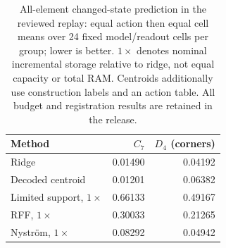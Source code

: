 \begin{table}[htbp]\centering\small
\begin{tabular}{lrr}\toprule
Method & $C_7$ & $D_4$ (corners) \\
\midrule
Ridge & 0.01490 & 0.04192 \\
Decoded centroid & 0.01201 & 0.06382 \\
Limited support, $1\times$ & 0.66133 & 0.49167 \\
RFF, $1\times$ & 0.30033 & 0.21265 \\
Nystr\"om, $1\times$ & 0.08292 & 0.04942 \\
\bottomrule\end{tabular}
\caption{All-element changed-state prediction in the reviewed replay: equal action then equal cell means over 24 fixed model/readout cells per group; lower is better. $1\times$ denotes nominal incremental storage relative to ridge, not equal capacity or total RAM. Centroids additionally use construction labels and an action table. All budget and registration results are retained in the release.}
\label{tab:reproduction-compact}\end{table}
